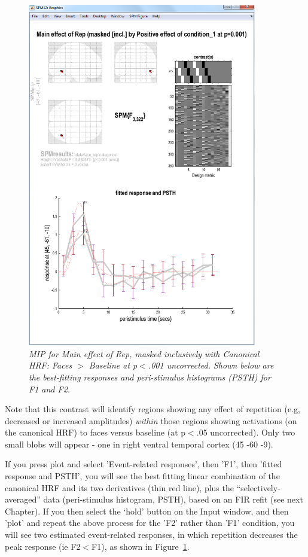 \documentclass[a4paper,titlepage]{book}
\begin{document}
\begin{figure}
\begin{center}
\includegraphics[width=100mm]{faces/cat3_psth}
\caption{\em MIP for Main effect of Rep, masked inclusively with Canonical HRF: Faces  $>$ Baseline at p$<$.001 uncorrected. Shown below are the best-fitting responses and peri-stimulus histograms (PSTH) for F1 and F2. \label{cat3_psth} } 
\end{center}
\end{figure}

Note that this contrast will identify regions showing any effect of repetition (e.g, decreased or increased amplitudes) {\em within} those regions showing activations (on the canonical HRF) to faces versus baseline (at p$<$.05 uncorrected). Only two small blobs will appear - one in right ventral temporal cortex (45 -60 -9).

If you press plot and select 'Event-related responses', then 'F1', then 'fitted response and PSTH', you will see the best fitting linear combination of the canonical HRF and its two derivatives (thin red line), plus the ``selectively-averaged'' data (peri-stimulus histogram, PSTH), based on an FIR refit (see next Chapter). 
If you then select the `hold' button on the Input window, and then 'plot' and repeat the above process for the 'F2' rather than 'F1' condition, you will see two estimated event-related responses, in which repetition decreases the peak response (ie F2$<$F1), as shown in Figure~\ref{cat3_psth}.
\end{document}

